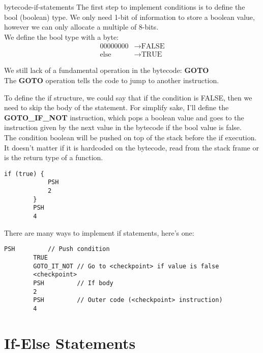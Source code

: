 \documentclass[preview]{standalone}
\begin{document}
\begin{snippet}{bytecode-if-statements}
    The first step to implement conditions is to define the bool (boolean) type. We only need 1-bit of information
    to store a boolean value, however we can only allocate a multiple of 8-bits.
    \\
    We define the bool type with a byte:
    \begin{align*}
        00000000 &\rightarrow \text{FALSE} \\
        \text{else} &\rightarrow \text{TRUE}
    \end{align*}
    
    We still lack of a fundamental operation in the bytecode: \textbf{GOTO}
    \\
    The \textbf{GOTO} operation tells the code to jump to another instruction.
    
    To define the if structure, we could say that if the condition is FALSE, then we need to skip the body of the statement.
    For simplify sake, I'll define the \textbf{GOTO\_IF\_NOT} instruction, which pops a boolean value and goes to the instruction
    given by the next value in the bytecode if the bool value is false.
    \\
    The condition boolean will be pushed on top of the stack before the if execution. It doesn't matter if it is
    hardcoded on the bytecode, read from the stack frame or is the return type of a function.
    
    \begin{lstlisting}[style=generic]
        if (true) {
            PSH
            2
        }
        PSH
        4
    \end{lstlisting}
    
    There are many ways to implement if statements, here's one:
    
    \begin{lstlisting}[style=generic]
        PSH         // Push condition
        TRUE
        GOTO_IT_NOT // Go to <checkpoint> if value is false
        <checkpoint>
        PSH         // If body
        2
        PSH         // Outer code (<checkpoint> instruction)
        4
    \end{lstlisting}
\end{snippet}

\section{If-Else Statements}
\end{document}
